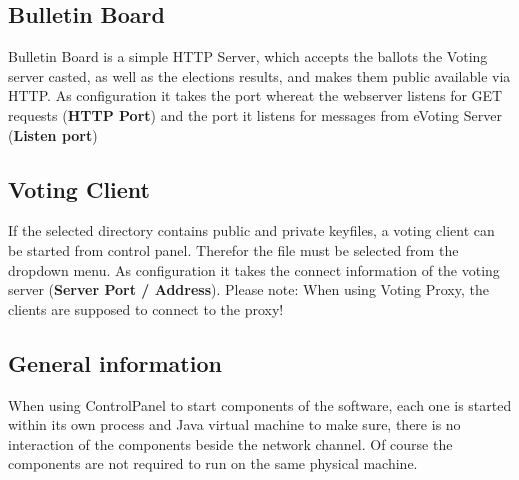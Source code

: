 \documentclass{article}
\begin{document}
\subsection{Bulletin Board}
Bulletin Board is a simple HTTP Server, which accepts the ballots the Voting server casted, as well as the elections results, and makes them public available via HTTP. As configuration it takes the port whereat the webserver listens for GET requests (\textbf{HTTP Port}) and the port it listens for messages from eVoting Server (\textbf{Listen port})

\subsection{Voting Client}
If the selected directory contains public and private keyfiles, a voting client can be started from control panel. Therefor the file must be selected from the dropdown menu. As configuration it takes the connect information of the voting server (\textbf{Server Port / Address}). Please note: When using Voting Proxy, the clients are supposed to connect to the proxy!


\subsection{General information}
When using ControlPanel to start components of the software, each one is started within its own process and Java virtual machine to make sure, there is no interaction of the components beside the network channel. Of course the components are not required to run on the same physical machine.
\end{document}
